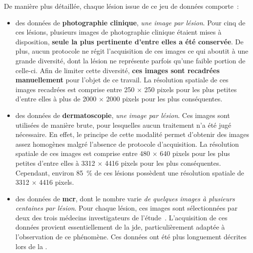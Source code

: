 De manière plus détaillée, chaque lésion issue de ce jeu de données comporte~:
\begin{itemize}
    \item des données de \textbf{photographie clinique}, \textit{une image par lésion}. Pour cinq de ces lésions, plusieurs images de photographie clinique étaient mises à disposition, \textbf{seule la plus pertinente d'entre elles a été conservée}. De plus, aucun protocole ne régit l'acquisition de ces images ce qui aboutit à une grande diversité, dont la lésion ne représente parfois qu'une faible portion de celle-ci. Afin de limiter cette diversité, \textbf{ces images sont recadrées manuellement} pour l'objet de ce travail. La résolution spatiale de ces images recadrées est comprise entre 250 $\times$ 250 pixels pour les plus petites d'entre elles à plus de 2000 $\times$ 2000 pixels pour les plus conséquentes.
    \item des données de \textbf{dermatoscopie}, \textit{une image par lésion}. Ces images sont utilisées de manière brute, pour lesquelles aucun traitement n'a été jugé nécessaire. En effet, le principe de cette modalité permet d'obtenir des images assez homogènes malgré l'absence de protocole d'acquisition. La résolution spatiale de ces images est comprise entre 480 $\times$ 640 pixels pour les plus petites d'entre elles à 3312 $\times$ 4416 pixels pour les plus conséquentes. Cependant, environ 85~\% de ces lésions possèdent une résolution spatiale de 3312 $\times$ 4416 pixels.
    \item des données de \textbf{\gls{mcr}}, dont le nombre varie \textit{de quelques images à plusieurs centaines par lésion}. Pour chaque lésion, ces images sont sélectionnées par deux des trois médecins investigateurs de l'étude~\cite{Cinotti2018}. L'acquisition de ces données provient essentiellement de la \gls{jde}, particulièrement adaptée à l'observation de ce phénomène. Ces données ont été plus longuement décrites lors de la .
\end{itemize}\par

